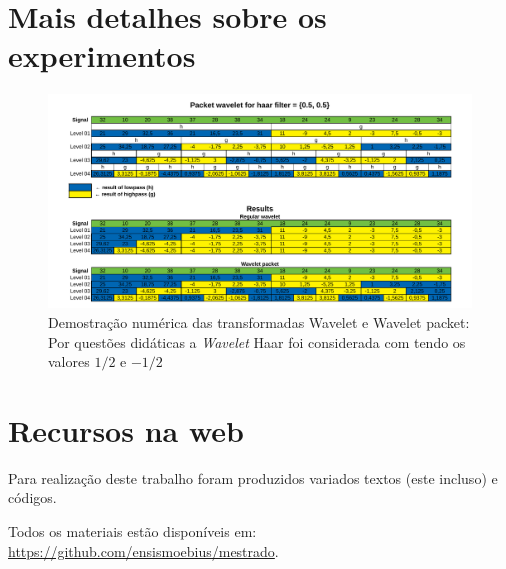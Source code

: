 \begin{apendicesenv}
	\partapendices
	\chapter{Mais detalhes sobre os experimentos}
		\begin{landscape}
			\begin{figure}[h]
				\includegraphics[width=1\linewidth]{images/haarWaveletExamples.pdf}
				\caption{Demostração numérica das transformadas Wavelet e Wavelet packet: Por questões didáticas a \textit{Wavelet} Haar foi considerada com tendo os valores $1/2$ e $-1/2$}
				\label{fig:haarWaveletExamples}
			\end{figure}
		\end{landscape}
	\chapter{Recursos na web}
		\par Para realização deste trabalho foram produzidos variados textos (este incluso) e códigos. 
		\par Todos os materiais estão disponíveis em:  \href{https://github.com/ensismoebius/mestrado}{https://github.com/ensismoebius/mestrado}.
\end{apendicesenv}